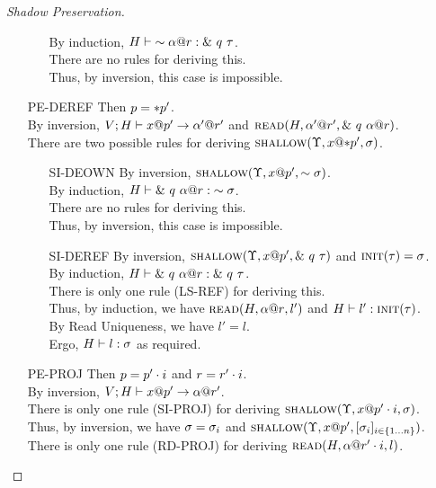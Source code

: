 \begin{proof}[Shadow Preservation]
\begin{itemize}
\begin{itemize}
	  By induction, ${H} \vdash {\sim{{\alpha}@{r}}} : {\&~{{q}~{\tau}}}$.\\
	  There are no rules for deriving this.\\
	  Thus, by inversion, this case is impossible.
      \end{itemize}
    \item[\textsc{PE-DEREF}] 
      Then $p = *{p'}$.\\
      By inversion, ${V;H} \vdash {{x}@{p'}} \to {{\alpha'}@{r'}}$
      and $\textsc{read}({H},{{\alpha'}@{r'}},{\&~{{q}~{{\alpha}@{r}}}})$.\\
      There are two possible rules for deriving $\textsc{shallow}({\Upsilon},{{x}@{*{p'}}},{\sigma})$.
      \begin{itemize}
	\item[\textsc{SI-DEOWN}]
	  By inversion, $\textsc{shallow}({\Upsilon},{{x}@{p'}},{\sim{\sigma}})$.\\
	  By induction, ${H} \vdash {\&~{{q}~{{\alpha}@{r}}}} : {\sim{\sigma}}$.\\
	  There are no rules for deriving this.\\
	  Thus, by inversion, this case is impossible.
	\item[\textsc{SI-DEREF}]
	  By inversion, $\textsc{shallow}({\Upsilon},{{x}@{p'}},{\&~{{q}~{\tau}}})$ and $\textsc{init}({\tau})=\sigma$.\\
	  By induction, ${H} \vdash {\&~{{q}~{{\alpha}@{r}}}} : {\&~{{q}~{\tau}}}$.\\
	  There is only one rule (\textsc{LS-REF}) for deriving this.\\
	  Thus, by induction, we have $\textsc{read}({H},{{\alpha}@{r}},{l'})$
	  and ${H} \vdash {l'} : {\textsc{init}({\tau})}$.\\
	  By Read Uniqueness, we have $l' = l$.\\
	  Ergo, ${H} \vdash {l} : {\sigma}$ as required.
      \end{itemize}
    \item[\textsc{PE-PROJ}] 
      Then $p = {p'}\cdot{i}$ and $r = {r'}\cdot{i}$.\\
      By inversion, ${V;H} \vdash {{x}@{p'}} \to {{\alpha}@{r'}}$.\\
      There is only one rule (\textsc{SI-PROJ}) for 
      deriving $\textsc{shallow}({\Upsilon},{{x}@{{p'}\cdot{i}}},{\sigma})$.\\
      Thus, by inversion, we have $\sigma=\sigma_i$ and
      $\textsc{shallow}({\Upsilon},{{x}@{p'}},{[{{\sigma}_{i}}]_{{i} \in \{1 \ldots {n}\} }})$.\\
      There is only one rule (\textsc{RD-PROJ}) for 
      deriving $\textsc{read}({H},{{\alpha}@{{r'}\cdot{i}}},{l})$.\\

\end{itemize}
\end{proof}
